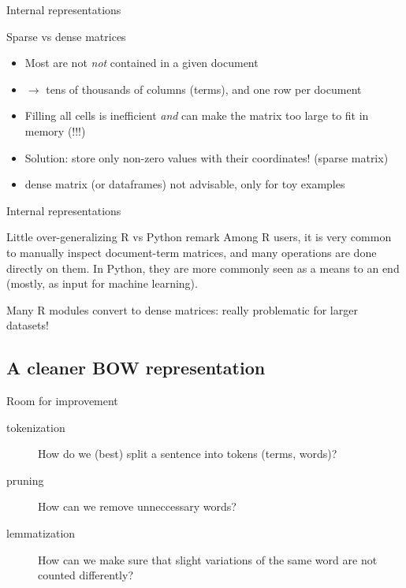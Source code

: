 \begin{frame}{Internal representations}
\begin{block}{Sparse vs dense matrices}
\begin{itemize}
	\item Most are not \emph{not} contained in a given document
	\item $\rightarrow$ tens of thousands of columns (terms), and one row per document
	\item Filling all cells is inefficient \emph{and} can make the matrix too large to fit in memory (!!!)
	\item Solution: store only non-zero values with their coordinates! (sparse matrix)
	\item dense matrix (or dataframes) not advisable, only for toy examples
\end{itemize}
\end{block}
\end{frame}



\begin{frame}{Internal representations}
	\begin{alertblock}{Little over-generalizing R vs Python remark}
		Among R users, it is very common to manually inspect document-term matrices, and many operations are done directly on them. In Python, they are more commonly seen as a means to an end (mostly, as input for machine learning). 
		
		Many R modules convert to dense matrices: really problematic for larger datasets!
	\end{alertblock}
	
\end{frame}






\subsection{A cleaner BOW representation}

\begin{frame}{Room for improvement}
\begin{description}
	\item[tokenization] How do we (best) split a sentence into tokens (terms, words)?
	\item[pruning] How can we remove unneccessary words?
	\item[lemmatization] How can we make sure that slight variations of the same word are not counted differently?

\end{description}
\end{frame}

